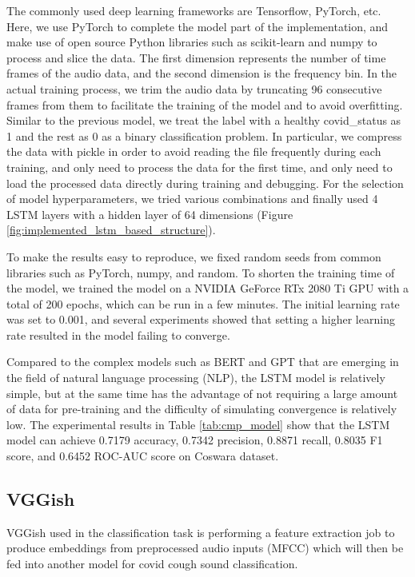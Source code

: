 \documentclass[11pt]{article}
\begin{document}
The commonly used deep learning frameworks are Tensorflow, PyTorch, etc. Here, we use PyTorch to complete the model part of the implementation, and make use of open source Python libraries such as scikit-learn and numpy to process and slice the data. The first dimension represents the number of time frames of the audio data, and the second dimension is the frequency bin. In the actual training process, we trim the audio data by truncating 96 consecutive frames from them to facilitate the training of the model and to avoid overfitting. Similar to the previous model, we treat the label with a healthy covid\_status as 1 and the rest as 0 as a binary classification problem. In particular, we compress the data with pickle in order to avoid reading the file frequently during each training, and only need to process the data for the first time, and only need to load the processed data directly during training and debugging. For the selection of model hyperparameters, we tried various combinations and finally used 4 LSTM layers with a hidden layer of 64 dimensions (Figure \ref{fig:implemented_lstm_based_structure}).

To make the results easy to reproduce, we fixed random seeds from common libraries such as PyTorch, numpy, and random. To shorten the training time of the model, we trained the model on a NVIDIA GeForce RTx 2080 Ti GPU with a total of 200 epochs, which can be run in a few minutes. The initial learning rate was set to 0.001, and several experiments showed that setting a higher learning rate resulted in the model failing to converge.

Compared to the complex models such as BERT \cite{devlin2018bert} and GPT \cite{floridi2020gpt} that are emerging in the field of natural language processing (NLP), the LSTM model is relatively simple, but at the same time has the advantage of not requiring a large amount of data for pre-training and the difficulty of simulating convergence is relatively low. The experimental results in Table \ref{tab:cmp_model} show that the LSTM model can achieve 0.7179 accuracy, 0.7342 precision, 0.8871 recall, 0.8035 F1 score, and 0.6452 ROC-AUC score on Coswara dataset.

\subsection{VGGish}

VGGish used in the classification task is performing a feature extraction job to produce embeddings from preprocessed audio inputs (MFCC) which will then be fed into another model for covid cough sound classification. 
\end{document}

